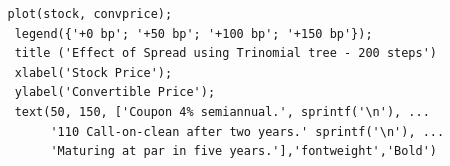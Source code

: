 \documentclass[smaller,compress, 9pt]{beamer}
\begin{document}
\begin{frame}[fragile]
 \begin{columns}
 \column{1.5in}
\lstset{language=Matlab,basicstyle=\tiny}
	\begin{lstlisting}
   plot(stock, convprice);
    legend({'+0 bp'; '+50 bp'; '+100 bp'; '+150 bp'});
    title ('Effect of Spread using Trinomial tree - 200 steps')
    xlabel('Stock Price');
    ylabel('Convertible Price');
    text(50, 150, ['Coupon 4% semiannual.', sprintf('\n'), ...
         '110 Call-on-clean after two years.' sprintf('\n'), ...
         'Maturing at par in five years.'],'fontweight','Bold')
 	\end{lstlisting}
 	
  \column{2.8in}
\begin{center}
\end{center}

\end{columns}
\end{frame}
\end{document}
